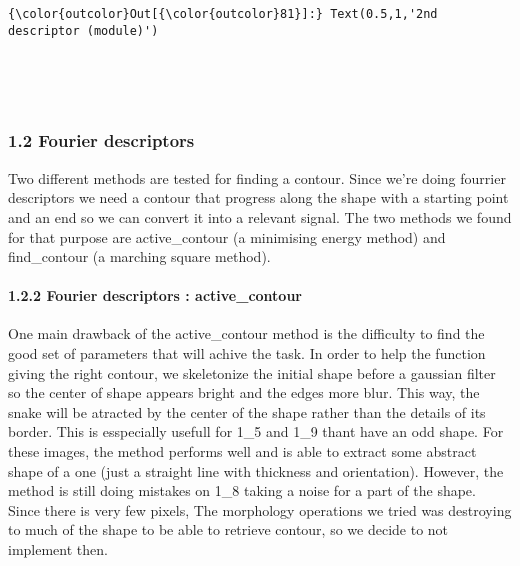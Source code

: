\documentclass[11pt]{article}
\begin{document}
\begin{Verbatim}[commandchars=\\\{\}]
{\color{outcolor}Out[{\color{outcolor}81}]:} Text(0.5,1,'2nd descriptor (module)')
\end{Verbatim}
            
    \begin{center}
    \end{center}
    { \hspace*{\fill} \\}
    
    \begin{center}
    \end{center}
    { \hspace*{\fill} \\}
    
    \subsubsection{1.2 Fourier descriptors}\label{fourier-descriptors}

Two different methods are tested for finding a contour. Since we're
doing fourrier descriptors we need a contour that progress along the
shape with a starting point and an end so we can convert it into a
relevant signal. The two methods we found for that purpose are
active\_contour (a minimising energy method) and find\_contour (a
marching square method).

    \paragraph{1.2.2 Fourier descriptors :
active\_contour}\label{fourier-descriptors-active_contour}

One main drawback of the active\_contour method is the difficulty to
find the good set of parameters that will achive the task. In order to
help the function giving the right contour, we skeletonize the initial
shape before a gaussian filter so the center of shape appears bright and
the edges more blur. This way, the snake will be atracted by the center
of the shape rather than the details of its border. This is esspecially
usefull for 1\_5 and 1\_9 thant have an odd shape. For these images, the
method performs well and is able to extract some abstract shape of a one
(just a straight line with thickness and orientation). However, the
method is still doing mistakes on 1\_8 taking a noise for a part of the
shape. Since there is very few pixels, The morphology operations we
tried was destroying to much of the shape to be able to retrieve
contour, so we decide to not implement then.
\end{document}
